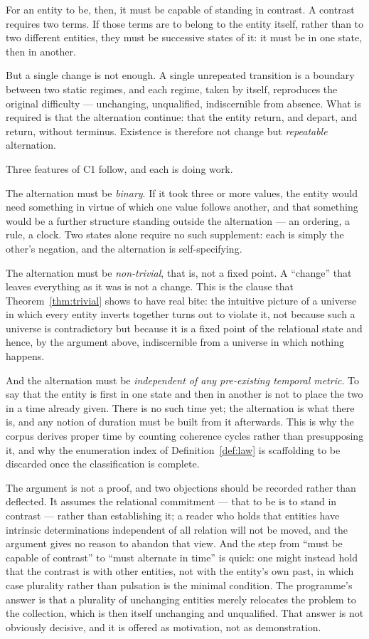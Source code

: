 \documentclass[11pt,a4paper]{article}
\begin{document}
For an entity to be, then, it must be capable of standing in contrast. A contrast requires two terms. If those terms are to belong to the entity itself, rather than to two different entities, they must be successive states of it: it must be in one state, then in another.

But a single change is not enough. A single unrepeated transition is a boundary between two static regimes, and each regime, taken by itself, reproduces the original difficulty --- unchanging, unqualified, indiscernible from absence. What is required is that the alternation continue: that the entity return, and depart, and return, without terminus. Existence is therefore not change but \emph{repeatable} alternation.

Three features of C1 follow, and each is doing work.

The alternation must be \emph{binary}. If it took three or more values, the entity would need something in virtue of which one value follows another, and that something would be a further structure standing outside the alternation --- an ordering, a rule, a clock. Two states alone require no such supplement: each is simply the other's negation, and the alternation is self-specifying.

The alternation must be \emph{non-trivial}, that is, not a fixed point. A ``change'' that leaves everything as it was is not a change. This is the clause that Theorem~\ref{thm:trivial} shows to have real bite: the intuitive picture of a universe in which every entity inverts together turns out to violate it, not because such a universe is contradictory but because it is a fixed point of the relational state and hence, by the argument above, indiscernible from a universe in which nothing happens.

And the alternation must be \emph{independent of any pre-existing temporal metric}. To say that the entity is first in one state and then in another is not to place the two in a time already given. There is no such time yet; the alternation is what there is, and any notion of duration must be built from it afterwards. This is why the corpus derives proper time by counting coherence cycles rather than presupposing it, and why the enumeration index of Definition~\ref{def:law} is scaffolding to be discarded once the classification is complete.

\medskip

The argument is not a proof, and two objections should be recorded rather than deflected. It assumes the relational commitment --- that to be is to stand in contrast --- rather than establishing it; a reader who holds that entities have intrinsic determinations independent of all relation will not be moved, and the argument gives no reason to abandon that view. And the step from ``must be capable of contrast'' to ``must alternate in time'' is quick: one might instead hold that the contrast is with other entities, not with the entity's own past, in which case plurality rather than pulsation is the minimal condition. The programme's answer is that a plurality of unchanging entities merely relocates the problem to the collection, which is then itself unchanging and unqualified. That answer is not obviously decisive, and it is offered as motivation, not as demonstration.

\clearpage


\end{document}
